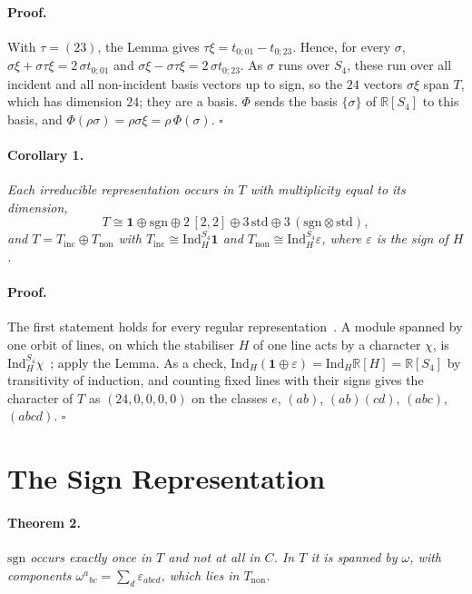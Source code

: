 \documentclass[twocolumn]{iopjournal}
\newcommand{\sgn}{\mathrm{sgn}}
\newcommand{\std}{\mathrm{std}}
\newcommand{\Ind}{\mathrm{Ind}}
\begin{document}
\paragraph{Proof.} With $\tau = (23)$, the Lemma gives
$\tau\xi = t_{0;01} - t_{0;23}$. Hence, for every $\sigma$,
$\sigma\xi + \sigma\tau\xi = 2\,\sigma t_{0;01}$ and
$\sigma\xi - \sigma\tau\xi = 2\,\sigma t_{0;23}$. As $\sigma$ runs
over $S_4$, these run over all incident and all non-incident basis
vectors up to sign, so the $24$ vectors $\sigma\xi$ span $T$, which
has dimension $24$; they are a basis. $\Phi$ sends the basis
$\{\sigma\}$ of $\mathbb{R}[S_4]$ to this basis, and
$\Phi(\rho\sigma) = \rho\sigma\xi = \rho\,\Phi(\sigma)$.
\hfill $\square$

\paragraph{Corollary 1.} \textit{Each irreducible representation
occurs in $T$ with multiplicity equal to its dimension,}
\begin{equation}
  T \cong \mathbf{1} \oplus \sgn \oplus 2\,[2,2] \oplus 3\,\std
  \oplus 3\,(\sgn \otimes \std),
\end{equation}
\textit{and $T = T_{\mathrm{inc}} \oplus T_{\mathrm{non}}$ with
$T_{\mathrm{inc}} \cong \Ind_H^{S_4}\mathbf{1}$ and
$T_{\mathrm{non}} \cong \Ind_H^{S_4}\varepsilon$, where
$\varepsilon$ is the sign of $H$.}

\paragraph{Proof.} The first statement holds for every regular
representation~\cite{Serre}. A module spanned by one orbit of lines,
on which the stabiliser $H$ of one line acts by a character $\chi$,
is $\Ind_H^{S_4}\chi$~\cite{Serre}; apply the Lemma. As a check,
$\Ind_H(\mathbf{1} \oplus \varepsilon) = \Ind_H \mathbb{R}[H] =
\mathbb{R}[S_4]$ by transitivity of induction, and counting fixed
lines with their signs gives the character of $T$ as
$(24, 0, 0, 0, 0)$ on the classes $e$, $(ab)$, $(ab)(cd)$, $(abc)$,
$(abcd)$. \hfill $\square$


\section*{The Sign Representation}

\paragraph{Theorem 2.} \textit{$\sgn$ occurs exactly once in $T$
and not at all in $C$. In $T$ it is spanned by $\omega$, with
components $\omega^a{}_{bc} = \sum_d \varepsilon_{abcd}$, which lies
in $T_{\mathrm{non}}$.}
\end{document}
